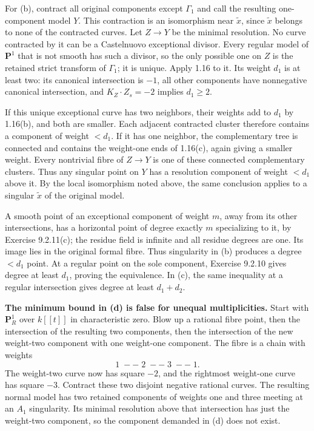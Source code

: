 \documentclass[11pt]{article}
\begin{document}
For (b), contract all original components except $\Gamma_1$ and call the resulting one-component model $Y$. This contraction is an isomorphism near $\widetilde x$, since $\widetilde x$ belongs to none of the contracted curves. Let $Z\to Y$ be the minimal resolution. No curve contracted by it can be a Castelnuovo exceptional divisor. Every regular model of $\mathbf P^1$ that is not smooth has such a divisor, so the only possible one on $Z$ is the retained strict transform of $\Gamma_1$; it is unique. Apply 1.16 to it. Its weight $d_1$ is at least two: its canonical intersection is $-1$, all other components have nonnegative canonical intersection, and $K_Z\cdot Z_s=-2$ implies $d_1\ge2$.

If this unique exceptional curve has two neighbors, their weights add to $d_1$ by 1.16(b), and both are smaller. Each adjacent contracted cluster therefore contains a component of weight $<d_1$. If it has one neighbor, the complementary tree is connected and contains the weight-one ends of 1.16(c), again giving a smaller weight. Every nontrivial fibre of $Z\to Y$ is one of these connected complementary clusters. Thus any singular point on $Y$ has a resolution component of weight $<d_1$ above it. By the local isomorphism noted above, the same conclusion applies to a singular $\widetilde x$ of the original model.

A smooth point of an exceptional component of weight $m$, away from its other intersections, has a horizontal point of degree exactly $m$ specializing to it, by Exercise 9.2.11(c); the residue field is infinite and all residue degrees are one. Its image lies in the original formal fibre. Thus singularity in (b) produces a degree $<d_1$ point. At a regular point on the sole component, Exercise 9.2.10 gives degree at least $d_1$, proving the equivalence. In (c), the same inequality at a regular intersection gives degree at least $d_1+d_2$.

\textbf{The minimum bound in (d) is false for unequal multiplicities.} Start with $\mathbf P^1_R$ over $k[[t]]$ in characteristic zero. Blow up a rational fibre point, then the intersection of the resulting two components, then the intersection of the new weight-two component with one weight-one component. The fibre is a chain with weights
\[ 1\;--\;2\;--\;3\;--\;1. \]
The weight-two curve now has square $-2$, and the rightmost weight-one curve has square $-3$. Contract these two disjoint negative rational curves. The resulting normal model has two retained components of weights one and three meeting at an $A_1$ singularity. Its minimal resolution above that intersection has just the weight-two component, so the component demanded in (d) does not exist.
\end{document}
